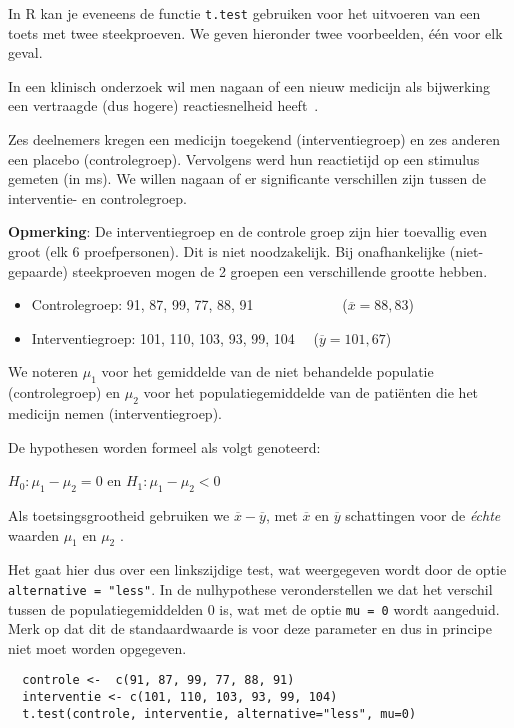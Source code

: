 In R kan je eveneens de functie \texttt{t.test} gebruiken voor het uitvoeren van een toets met twee steekproeven. We geven hieronder twee voorbeelden, één voor elk geval.

\begin{example}
  In een klinisch onderzoek wil men nagaan of een nieuw medicijn als bijwerking een vertraagde (dus hogere) reactiesnelheid heeft~\autocite{Lindquist}.
  
  Zes deelnemers kregen een medicijn toegekend (interventiegroep) en zes anderen een placebo (controlegroep). Vervolgens werd hun reactietijd op een stimulus gemeten (in ms). We willen nagaan of er significante verschillen zijn tussen de interventie- en controlegroep.
  
  \textbf{Opmerking}: De interventiegroep en de controle groep zijn hier toevallig even groot (elk 6 proefpersonen).
  Dit is niet noodzakelijk. Bij onafhankelijke (niet-gepaarde) steekproeven mogen de 2 groepen een verschillende grootte hebben.
  
  \begin{itemize}
    \item Controlegroep: 91, 87, 99, 77, 88, 91 ~~~~~~~~~~~~($\overline{x}=88,83$)
    \item Interventiegroep: 101, 110, 103, 93, 99, 104 ~~($\overline{y}=101,67$)
  \end{itemize}
  
  We noteren $\mu_1$ voor het gemiddelde van de niet behandelde populatie (controlegroep) en $\mu_2$ voor het populatiegemiddelde van de patiënten die het medicijn nemen (interventiegroep).
  
  De hypothesen worden formeel als volgt genoteerd:
  
  $H_0: \mu_1 - \mu_2 = 0$ en $H_1: \mu_1 - \mu_2 < 0$
  
  Als toetsingsgrootheid gebruiken we $\overline{x}-\overline{y}$, met $\overline{x}$ en $\overline{y}$ schattingen voor de \textit{\'echte} waarden $\mu_1$ en $\mu_2$ .
  
  Het gaat hier dus over een linkszijdige test, wat weergegeven wordt door de optie \texttt{alternative = "less"}. In de nulhypothese veronderstellen we dat het verschil tussen de populatiegemiddelden 0 is, wat met de optie \texttt{mu = 0} wordt aangeduid. Merk op dat dit de standaardwaarde is voor deze parameter en dus in principe niet moet worden opgegeven.
  
  \begin{lstlisting}
  controle <-  c(91, 87, 99, 77, 88, 91)
  interventie <- c(101, 110, 103, 93, 99, 104)
  t.test(controle, interventie, alternative="less", mu=0)
  \end{lstlisting}
  

\end{example}
